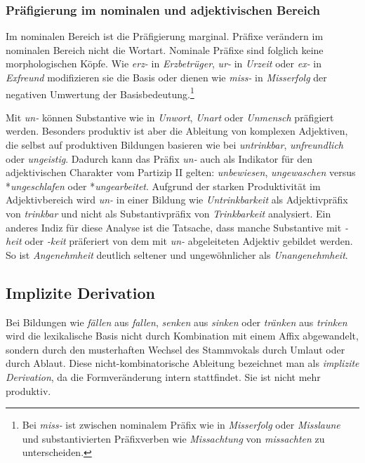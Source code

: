 \subsubsection{Präfigierung im nominalen und adjektivischen Bereich}\label{subsubsection:Präfix_Nomen}

Im nominalen Bereich ist die Präfigierung marginal. Präfixe verändern im nominalen Bereich nicht die Wortart. Nominale Präfixe sind folglich keine morphologischen Köpfe. Wie \textit{erz-} in \textit{Erzbetrüger}, \textit{ur-} in \textit{Urzeit} oder \textit{ex-} in \textit{Exfreund} modifizieren sie die Basis oder dienen wie \textit{miss-} in \textit{Misserfolg} der negativen Umwertung der Basisbedeutung.\footnote{Bei \textit{miss-} ist zwischen nominalem Präfix wie in \textit{Misserfolg} oder \textit{Misslaune} und substantivierten Präfixverben wie \textit{Missachtung} von \textit{missachten} zu unterscheiden.}

Mit \textit{un-} können Substantive wie in \textit{Unwort}, \textit{Unart} oder \textit{Unmensch} präfigiert werden. Besonders produktiv ist aber die Ableitung von komplexen Adjektiven, die selbst auf produktiven Bildungen basieren wie bei \textit{untrinkbar}, \textit{unfreundlich} oder \textit{ungeistig}. Dadurch kann das Präfix \textit{un-} auch als Indikator für den adjektivischen Charakter vom Partizip II gelten: \textit{unbewiesen}, \textit{ungewaschen} versus *\textit{ungeschlafen} oder *\textit{ungearbeitet}. Aufgrund der starken Produktivität im Adjektivbereich wird \textit{un-} in einer Bildung wie \textit{Untrinkbarkeit} als Adjektivpräfix von \textit{trinkbar} und nicht als Substantivpräfix von \textit{Trinkbarkeit} analysiert. Ein anderes Indiz für diese Analyse ist die Tatsache, dass manche Substantive mit \textit{-heit} oder \textit{-keit} präferiert von dem mit \textit{un-} abgeleiteten Adjektiv gebildet werden. So ist \textit{Angenehmheit} deutlich seltener und ungewöhnlicher als \textit{Unangenehmheit}. 


\subsection{Implizite Derivation}\label{subsection:ImplDerivation}

Bei Bildungen wie \textit{fällen} aus \textit{fallen}, \textit{senken} aus \textit{sinken} oder \textit{tränken} aus \textit{trinken} wird die lexikalische Basis nicht durch Kombination mit einem Affix abgewandelt, sondern durch den musterhaften Wechsel des Stammvokals durch Umlaut oder durch Ablaut. Diese nicht-kombinatorische Ableitung bezeichnet man als \textit{implizite Derivation}, da die Formveränderung intern stattfindet. Sie ist nicht mehr produktiv.

